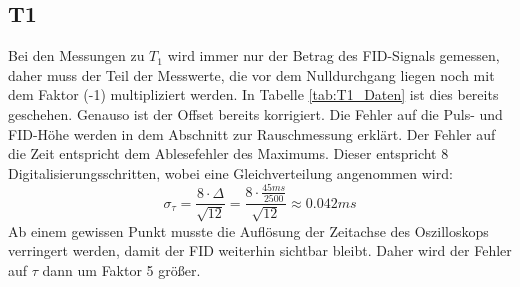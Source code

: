 \documentclass[12pt,a4paper]{article}
\begin{document}
\subsection{T1}
Bei den Messungen zu $T_1$ wird immer nur der Betrag des FID-Signals gemessen, daher muss der Teil der Messwerte, die vor dem Nulldurchgang liegen noch mit dem Faktor (-1) multipliziert werden. In Tabelle \ref{tab:T1_Daten} ist dies bereits geschehen. Genauso ist der Offset bereits korrigiert. Die Fehler auf die Puls- und FID-Höhe werden in dem Abschnitt zur Rauschmessung erklärt. Der Fehler auf die Zeit entspricht dem Ablesefehler des Maximums. Dieser entspricht 8 Digitalisierungsschritten, wobei eine Gleichverteilung angenommen wird:
\begin{equation*}
\sigma _{\tau} = \dfrac{8 \cdot \Delta}{\sqrt{12}} = \dfrac{8 \cdot \frac{45 ms}{2500}}{\sqrt{12}} \approx 0.042 ms
\end{equation*}
Ab einem gewissen Punkt musste die Auflösung der Zeitachse des Oszilloskops verringert werden, damit der FID weiterhin sichtbar bleibt. Daher wird der Fehler auf $\tau$ dann um Faktor 5 größer.
\end{document}
